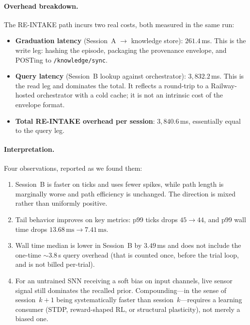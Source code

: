 \documentclass[sigchi-a]{acmart}
\begin{document}
\paragraph{Overhead breakdown.}
The RE-INTAKE path incurs two real costs, both measured in the same
run:
\begin{itemize}
\item \textbf{Graduation latency} (Session~A $\to$ knowledge store):
  $261.4$\,ms. This is the write leg: hashing the episode,
      packaging the provenance envelope, and POSTing to
      \texttt{/knowledge/sync}.
\item \textbf{Query latency} (Session~B lookup against orchestrator):
  $3{,}832.2$\,ms. This is the read leg and dominates the total.
      It reflects a round-trip to a Railway-hosted orchestrator with
      a cold cache; it is not an intrinsic cost of the envelope
      format.
\item \textbf{Total RE-INTAKE overhead per session}: $3{,}840.6$\,ms,
      essentially equal to the query leg.
\end{itemize}

\paragraph{Interpretation.}
Four observations, reported as we found them:
\begin{enumerate}
\item Session~B is faster on ticks and uses fewer spikes, while path
  length is marginally worse and path efficiency is unchanged.
  The direction is mixed rather than uniformly positive.
\item Tail behavior improves on key metrics: p99 ticks drops
  $45 \to 44$, and p99 wall time drops $13.68\,\mathrm{ms} \to 7.41\,\mathrm{ms}$.
\item Wall time median is lower in Session~B by $3.49$\,ms and does
  not include the one-time $\sim 3.8$\,s query overhead
      (that is counted once, before the trial loop, and is not
      billed per-trial).
\item For an untrained SNN receiving a soft bias on input channels,
      live sensor signal still dominates the recalled prior.
      Compounding---in the sense of session~$k{+}1$ being
      systematically faster than session~$k$---requires a learning
      consumer (STDP, reward-shaped RL, or structural plasticity),
      not merely a biased one.
\end{enumerate}
\end{document}

